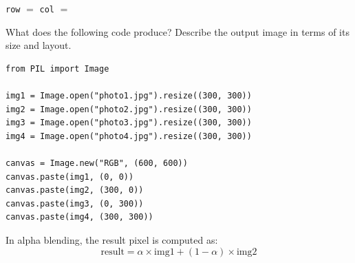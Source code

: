 \documentclass{csexam}
\begin{document}
\begin{questions}
\vspace{0.3cm}
\texttt{row} $=$ \underline{\hspace{1in}} \hspace{1cm} \texttt{col} $=$ \underline{\hspace{1in}}

\newpage

\question[3] What does the following code produce? Describe the output image in terms of its size and layout.

\begin{lstlisting}
from PIL import Image

img1 = Image.open("photo1.jpg").resize((300, 300))
img2 = Image.open("photo2.jpg").resize((300, 300))
img3 = Image.open("photo3.jpg").resize((300, 300))
img4 = Image.open("photo4.jpg").resize((300, 300))

canvas = Image.new("RGB", (600, 600))
canvas.paste(img1, (0, 0))
canvas.paste(img2, (300, 0))
canvas.paste(img3, (0, 300))
canvas.paste(img4, (300, 300))
\end{lstlisting}

\vspace{1.5in}

\question[3] In alpha blending, the result pixel is computed as:
\[
    \text{result} = \alpha \times \text{img1} + (1 - \alpha) \times \text{img2}
\]



\end{questions}
\end{document}
